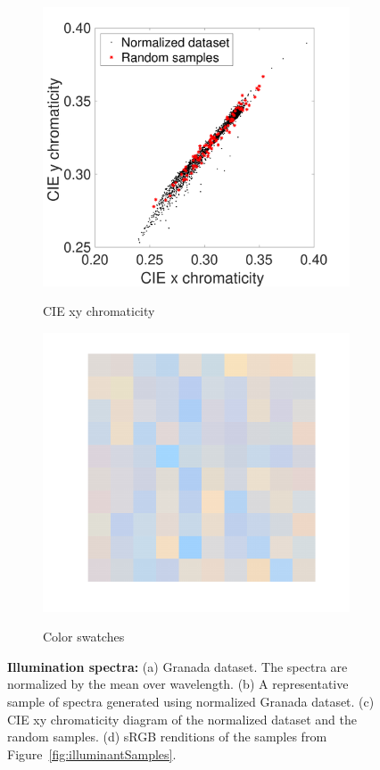 \documentclass{jov}
\begin{document}
\begin{figure}
      	\begin{subfigure}[b]{0.24 \textwidth}
    \centering
        \caption{CIE xy chromaticity}
        \includegraphics[width=\textwidth]{../FiguresDraft4/Figure6/Figure6_c.pdf}
        \label{fig:xyDiagram}
        \end{subfigure}
      	\begin{subfigure}[b]{0.24 \textwidth}
    \centering
        \caption{Color swatches}
        \includegraphics[width=\textwidth]{../FiguresDraft4/Figure6/Figure6_d.pdf}
        \label{fig:sRGBIlluminant}
    \end{subfigure}
    \caption{{\bf Illumination spectra:} (a) Granada dataset. The spectra are normalized by the mean over wavelength. (b) A representative sample of spectra generated using normalized Granada dataset. (c) CIE xy chromaticity diagram of the normalized dataset and the random samples. (d) sRGB renditions of the samples from Figure~\ref{fig:illuminantSamples}.}
\label{fig:illuminant}
\end{figure}
\end{document}

